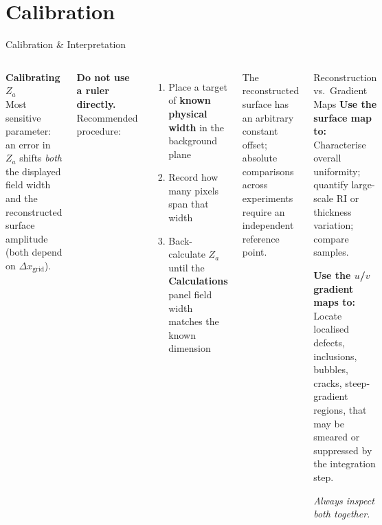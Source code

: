 \documentclass[9pt, aspectratio=169]{beamer}
\begin{document}
\section{Calibration}

\begin{frame}{Calibration \& Interpretation}{}
  \begin{columns}[t]
      \textbf{Calibrating $Z_a$}\\
      Most sensitive parameter: an error in $Z_a$ shifts \emph{both} the displayed field width and the reconstructed surface amplitude (both depend on $\Delta x_\mathrm{grid}$).

      \vspace{0.3em}
      \textbf{Do not use a ruler directly.} Recommended procedure:
      \begin{enumerate}
        \small
        \item Place a target of \textbf{known physical width} in the background plane
        \item Record how many pixels span that width
        \item Back-calculate $Z_a$ until the \textbf{Calculations} panel field width matches the known dimension
      \end{enumerate}
      \vspace{0.3em}
      \small The reconstructed surface has an arbitrary constant offset; absolute comparisons across experiments require an independent reference point.
      \begin{block}{Reconstruction vs.\ Gradient Maps}
        \textbf{Use the surface map to:}\\
        Characterise overall uniformity; quantify large-scale RI or thickness variation; compare samples.

        \vspace{0.3em}
        \textbf{Use the $u$/$v$ gradient maps to:}\\
        Locate localised defects, inclusions, bubbles, cracks, steep-gradient regions, that may be smeared or suppressed by the integration step.

        \vspace{0.3em}
        \emph{Always inspect both together.}
      \end{block}
  \end{columns}
\end{frame}
\end{document}
